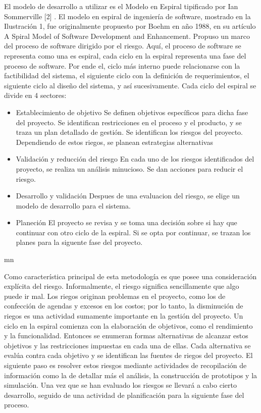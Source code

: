 \documentclass[a4paper,11pt]{article}
\begin{document}
El modelo de desarrollo a utilizar es el Modelo en Espiral tipificado por Ian Sommerville [2] . El modelo en espiral de ingeniería de software, mostrado en la Ilustración 1, fue originalmente propuesto por Boehm en año 1988, en su artículo A Spiral Model of Software Development and Enhancement. Propuso un marco del proceso de software dirigido por el riesgo. Aquí, el proceso de software se representa como una es espiral, cada ciclo en la espiral representa una fase del proceso de software. Por ende el, ciclo más interno puede relacionarse con la factibilidad del sistema, el siguiente ciclo con la definición de requerimientos, el siguiente ciclo al diseño del sistema, y así sucesivamente.
Cada ciclo del espiral se divide en 4 sectores:
 
\begin {itemize}
\item Establecimiento de objetivo  Se definen objetivos específicos para dicha fase del proyecto. Se identifican restricciones en el proceso y el producto, y se traza un plan detallado de gestión. Se identifican los riesgos del proyecto. Dependiendo de estos riegos, se planean estrategias alternativas
\item Validación y reducción del riesgo  En cada uno de los riesgos identificados del proyecto, se realiza un análisis minucioso. Se dan acciones para reducir el riesgo.
\item Desarrollo y validación  Despues de una evaluacion del riesgo, se elige un modelo de desarrollo para el sistema.
\item Planeción  El proyecto se revisa y se toma una decisión sobre si hay que continuar con otro ciclo de la espiral. Si se opta por continuar, se trazan los planes para la siguente fase del proyecto.
 \end {itemize}mn

Como característica principal de esta metodología es que posee una consideración explícita del riesgo. Informalmente, el riesgo significa sencillamente que algo puede ir mal. Los riegos originan problemas en el proyecto, como los de confección de agendas y excesos en los costos; por lo tanto, la disminución de riegos es una actividad sumamente importante en la gestión del proyecto.
Un ciclo en la espiral comienza con la elaboración de objetivos, como el rendimiento y la funcionalidad. Entonces se enumeran formas alternativas de alcanzar estos objetivos y las restricciones impuestas en cada una de ellas. Cada alternativa se evalúa contra cada objetivo y se identifican las fuentes de riegos del proyecto. El siguiente paso es resolver estos riesgos mediante actividades de recopilación de información como la de detallar más el análisis, la construcción de prototipos y la simulación. Una vez que se han evaluado los riesgos se llevará a cabo cierto desarrollo, seguido de una actividad de planificación para la siguiente fase del proceso.
\end{document}
